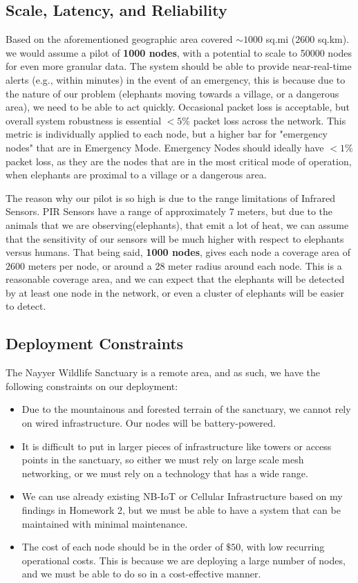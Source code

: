 \subsection{Scale, Latency, and Reliability}

Based on the aforementioned geographic area covered $\sim1000$ sq.mi ($2600$ sq.km). we would assume a pilot of \textbf{1000 nodes}, with a potential to scale to 50000 nodes for even more granular data. The system should be able to provide near-real-time alerts (e.g., within minutes) in the event of an emergency, this is because due to the nature of our problem (elephants moving towards a village, or a dangerous area), we need to be able to act quickly. Occasional packet loss is acceptable, but overall system robustness is essential $<5\%$ packet loss across the network. This metric is individually applied to each node, but a higher bar for "emergency nodes" that are in Emergency Mode. Emergency Nodes should ideally have $<1\%$ packet loss, as they are the nodes that are in the most critical mode of operation, when elephants are proximal to a village or a dangerous area.

The reason why our pilot is so high is due to the range limitations of Infrared Sensors. PIR Sensors have a range of approximately $7$ meters, but due to the animals that we are observing(elephants), that emit a lot of heat, we can assume that the sensitivity of our sensors will be much higher with respect to elephants versus humans. That being said, \textbf{1000 nodes}, gives each node a coverage area of $2600$ meters per node, or around a 28 meter radius around each node. This is a reasonable coverage area, and we can expect that the elephants will be detected by at least one node in the network, or even a cluster of elephants will be easier to detect.



\subsection{Deployment Constraints}

The Nayyer Wildlife Sanctuary is a remote area, and as such, we have the following constraints on our deployment:
\begin{itemize}
    \item Due to the mountainous and forested terrain of the sanctuary, we cannot rely on wired infrastructure. Our nodes will be battery-powered.
    \item It is difficult to put in larger pieces of infrastructure like towers or access points in the sanctuary, so either we must rely on large scale mesh networking, or we must rely on a technology that has a wide range.
    \item We can use already existing NB-IoT or Cellular Infrastructure based on my findings in Homework 2, but we must be able to have a system that can be maintained with minimal maintenance.
    \item The cost of each node should be in the order of $\$50$, with low recurring operational costs. This is because we are deploying a large number of nodes, and we must be able to do so in a cost-effective manner.
\end{itemize}

